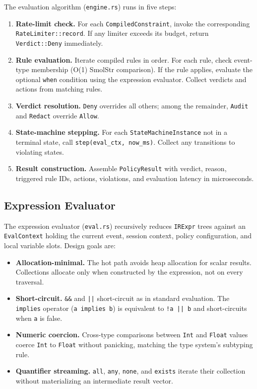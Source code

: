 \documentclass[sigconf]{acmart}
\begin{document}
The evaluation algorithm (\texttt{engine.rs}) runs in five steps:
\begin{enumerate}
  \item \textbf{Rate-limit check.} For each \texttt{CompiledConstraint},
    invoke the corresponding \texttt{RateLimiter::record}. If any limiter
    exceeds its budget, return \texttt{Verdict::Deny} immediately.
  \item \textbf{Rule evaluation.} Iterate compiled rules in order. For each
    rule, check event-type membership (O(1) SmolStr comparison). If the rule
    applies, evaluate the optional \texttt{when} condition using the expression
    evaluator. Collect verdicts and actions from matching rules.
  \item \textbf{Verdict resolution.} \texttt{Deny} overrides all others;
    among the remainder, \texttt{Audit} and \texttt{Redact} override
    \texttt{Allow}.
  \item \textbf{State-machine stepping.} For each \texttt{StateMachineInstance}
    not in a terminal state, call \texttt{step(eval\_ctx, now\_ms)}. Collect
    any transitions to violating states.
  \item \textbf{Result construction.} Assemble \texttt{PolicyResult} with
    verdict, reason, triggered rule IDs, actions, violations, and evaluation
    latency in microseconds.
\end{enumerate}

\subsection{Expression Evaluator}

The expression evaluator (\texttt{eval.rs}) recursively reduces \texttt{IRExpr}
trees against an \texttt{EvalContext} holding the current event, session context,
policy configuration, and local variable slots. Design goals are:

\begin{itemize}
  \item \textbf{Allocation-minimal.} The hot path avoids heap allocation
    for scalar results. Collections allocate only when constructed by the
    expression, not on every traversal.
  \item \textbf{Short-circuit.} \texttt{\&\&} and \texttt{||} short-circuit
    as in standard evaluation. The \texttt{implies} operator (\texttt{a implies
    b}) is equivalent to \texttt{!a || b} and short-circuits when \texttt{a}
    is false.
  \item \textbf{Numeric coercion.} Cross-type comparisons between
    \texttt{Int} and \texttt{Float} values coerce \texttt{Int} to \texttt{Float}
    without panicking, matching the type system's subtyping rule.
  \item \textbf{Quantifier streaming.} \texttt{all}, \texttt{any},
    \texttt{none}, and \texttt{exists} iterate their collection without
    materializing an intermediate result vector.
\end{itemize}
\end{document}
